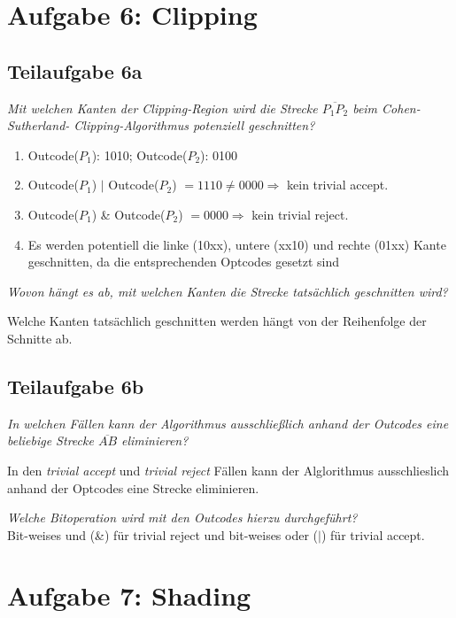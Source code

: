 \documentclass[a4paper]{scrartcl}
\begin{document}
\clearpage
\section*{Aufgabe 6: Clipping}
\subsection*{Teilaufgabe 6a}
\textit{Mit welchen Kanten der Clipping-Region wird die Strecke $\overline{P_{1}P_{2}}$ beim Cohen-Sutherland-
Clipping-Algorithmus potenziell geschnitten?}

\begin{enumerate}
    \item Outcode($P_1$): 1010; Outcode($P_2$): 0100
    \item Outcode($P_1$) $|$ Outcode($P_2$) $ = 1110 \neq 0000 \Rightarrow$ kein trivial accept.
    \item Outcode($P_1$) \& Outcode($P_2$) $ = 0000 \Rightarrow$ kein trivial reject.
    \item Es werden potentiell die linke (10xx), untere (xx10) und rechte
          (01xx) Kante geschnitten, da die entsprechenden Optcodes gesetzt sind
\end{enumerate}

\textit{Wovon hängt es ab, mit welchen Kanten die Strecke tatsächlich
geschnitten wird?}

Welche Kanten tatsächlich geschnitten werden hängt von der Reihenfolge der
Schnitte ab.


\subsection*{Teilaufgabe 6b}

\textit{In welchen Fällen kann der Algorithmus ausschließlich anhand der Outcodes eine
beliebige Strecke $\overline{AB}$ eliminieren?}

In den \textit{trivial accept} und \textit{trivial reject} Fällen kann der
Alglorithmus ausschlieslich anhand der Optcodes eine Strecke eliminieren.

\textit{Welche Bitoperation wird mit den Outcodes hierzu durchgeführt?}\\

Bit-weises und (\&) für trivial reject und bit-weises oder ($|$) für trivial
accept.


\section*{Aufgabe 7: Shading}
\end{document}

